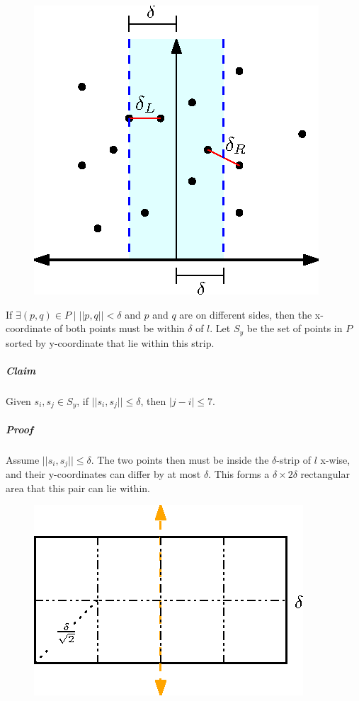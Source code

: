 \documentclass[11pt]{article}
\begin{document}
	\begin{figure}[htb]
		\centering
		\includegraphics{closest-pair.eps}
	\end{figure}
	
	If $\exists (p, q) \in P \mid ||p, q|| < \delta$ and $p$ and $q$ are on different sides, then the x-coordinate of both points must be within $\delta$ of $l$. Let $S_y$ be the set of points in $P$ sorted by y-coordinate that lie within this strip.
	
	\subparagraph{Claim} Given $s_i, s_j \in S_y$, if $||s_i, s_j|| \leq \delta$, then $|j - i| \leq 7$.
	
	\subparagraph{Proof} Assume $||s_i, s_j|| \leq \delta$. The two points then must be inside the $\delta$-strip of $l$ x-wise, and their y-coordinates can differ by at most $\delta$.  This forms a $\delta \times 2\delta$ rectangular area that this pair can lie within.
	
	\begin{figure}[htb]
		\centering
		\includegraphics{closest-pair-square.eps}
	\end{figure}
	
\end{document}
